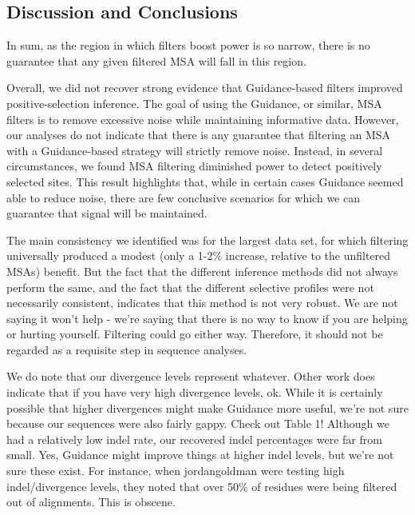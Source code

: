 \documentclass[11pt]{article}
\begin{document}
\subsection*{Discussion and Conclusions}


 In sum, as the region in which filters boost power is so narrow, there is no guarantee that any given filtered MSA will fall in this region.


Overall, we did not recover strong evidence that Guidance-based filters improved positive-selection inference. The goal of using the Guidance, or similar, MSA filters is to remove excessive noise while maintaining informative data. However, our analyses do not indicate that there is any guarantee that filtering an MSA with a Guidance-based strategy will strictly remove noise. Instead, in several circumstances, we found MSA filtering diminished power to detect positively selected sites. This result highlights that, while in certain cases Guidance seemed able to reduce noise, there are few conclusive scenarios for which we can guarantee that signal will be maintained.

The main consistency we identified was for the largest data set, for which filtering universally produced a modest (only a 1-2\% increase, relative to the unfiltered MSAs) benefit. But the fact that the different inference methods did not always perform the same, and the fact that the different selective profiles were not necessarily consistent, indicates that this method is not very robust. We are not saying it won't help - we're saying that there is no way to know if you are helping or hurting yourself. Filtering could go either way. Therefore, it should not be regarded as a requisite step in sequence analyses.

We do note that our divergence levels represent whatever. Other work does indicate that if you have very high divergence levels, ok. While it is certainly possible that higher divergences might make Guidance more useful, we're not sure because our sequences were also fairly gappy. Check out Table 1! Although we had a relatively low indel rate, our recovered indel percentages were far from small. Yes, Guidance might improve things at higher indel levels, but we're not sure these exist. For instance, when jordangoldman were testing high indel/divergence levels, they noted that over 50\% of residues were being filtered out of alignments. This is obscene.
\end{document}
